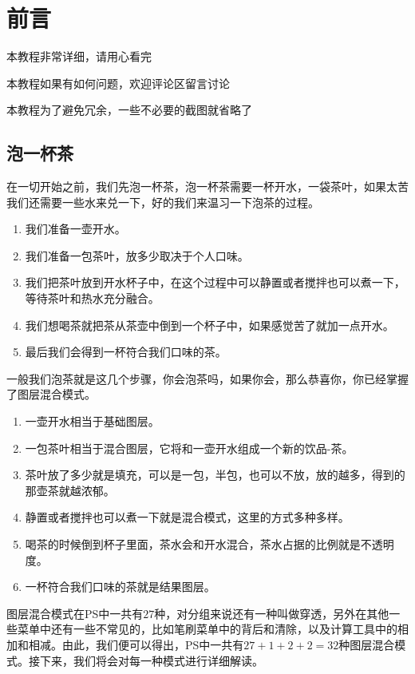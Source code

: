 
\chapter{前言}

\begin{introduction}
	\item 本教程非常详细，请用心看完
	\item 本教程如果有如何问题，欢迎评论区留言讨论
	\item 本教程为了避免冗余，一些不必要的截图就省略了
	\item {}
	\item {}
\end{introduction}

\section{ 泡一杯茶}
\indent 在一切开始之前，我们先泡一杯茶，泡一杯茶需要一杯开水，一袋茶叶，如果太苦我们还需要一些水来兑一下，好的我们来温习一下泡茶的过程。
\begin{zhujie}
	\begin{enumerate}
		\item  我们准备一壶开水。
		\item  我们准备一包茶叶，放多少取决于个人口味。
		\item  我们把茶叶放到开水杯子中，在这个过程中可以静置或者搅拌也可以煮一下，等待茶叶和热水充分融合。
		\item  我们想喝茶就把茶从茶壶中倒到一个杯子中，如果感觉苦了就加一点开水。
		\item  最后我们会得到一杯符合我们口味的茶。
	\end{enumerate}
\end{zhujie}

 一般我们泡茶就是这几个步骤，你会泡茶吗，如果你会，那么恭喜你，你已经掌握了图层混合模式。

\begin{zhujie}
	\begin{enumerate}
		\item  一壶开水相当于基础图层。
		\item  一包茶叶相当于混合图层，它将和一壶开水组成一个新的饮品-茶。
		\item  茶叶放了多少就是填充，可以是一包，半包，也可以不放，放的越多，得到的那壶茶就越浓郁。
		\item  静置或者搅拌也可以煮一下就是混合模式，这里的方式多种多样。
		\item  喝茶的时候倒到杯子里面，茶水会和开水混合，茶水占据的比例就是不透明度。
		\item  一杯符合我们口味的茶就是结果图层。
	\end{enumerate}
\end{zhujie}
\begin{notice}
\item 图层混合模式在PS中一共有$27$种，对分组来说还有一种叫做穿透，另外在其他一些菜单中还有一些不常见的，比如笔刷菜单中的背后和清除，以及计算工具中的相加和相减。由此，我们便可以得出，PS中一共有$27+1+2+2=32$种图层混合模式。接下来，我们将会对每一种模式进行详细解读。
\end{notice}
 
